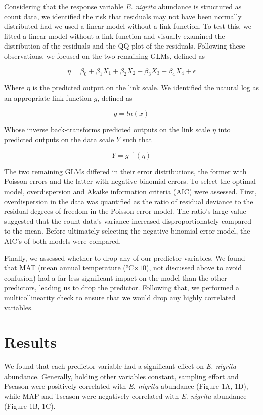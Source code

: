 \documentclass{article}
\begin{document}
Considering that the response variable \textit{E. nigrita} abundance is structured as count data, we identified the risk that residuals may not have been normally distributed had we used a linear model without a link function. To test this, we fitted a linear model without a link function and visually examined the distribution of the residuals and the QQ plot of the residuals. Following these observations, we focused on the two remaining GLMs, defined as

$$
\eta = \beta_0 + \beta_1 X_1 + \beta_2 X_2 + \beta_3 X_3 + \beta_4 X_4 + \epsilon
$$

Where $\eta$ is the predicted output on the link scale. We identified the natural log as an appropriate link function $g$, defined as

$$
g = ln(x)
$$

Whose inverse back-transforms predicted outputs on the link scale $\eta$ into predicted outputs on the data scale $Y$ such that

$$
Y = g^{-1}(\eta)
$$

The two remaining GLMs differed in their error distributions, the former with Poisson errors and the latter with negative binomial errors. To select the optimal model, overdispersion and Akaike information criteria (AIC) were assessed. First, overdispersion in the data was quantified as the ratio of residual deviance to the residual degrees of freedom in the Poisson-error model. The ratio's large value suggested that the count data's variance increased disproportionately compared to the mean. Before ultimately selecting the negative binomial-error model, the AIC's of both models were compared.

Finally, we assessed whether to drop any of our predictor variables. We found that MAT (mean annual temperature (°C$\times 10$), not discussed above to avoid confusion) had a far less significant impact on the model than the other predictors, leading us to drop the predictor. Following that, we performed a multicollinearity check to ensure that we would drop any highly correlated variables.

\section{Results}

We found that each predictor variable had a significant effect on \textit{E. nigrita} abundance. Generally, holding other variables constant, sampling effort and Pseason were positively correlated with \textit{E. nigrita} abundance (Figure 1A, 1D), while MAP and Tseason were negatively correlated with \textit{E. nigrita} abundance (Figure 1B, 1C).
\end{document}
